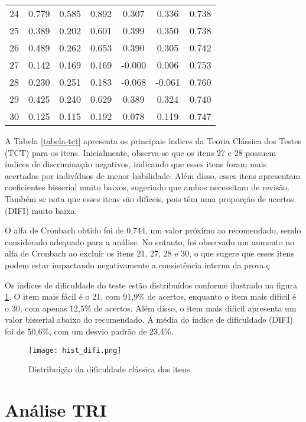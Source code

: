 \begin{table}[H]
{\begin{tabular*}{.6\textwidth}{@{\extracolsep{\fill}}ccccccc@{}}
			24 & 0.779 & 0.585 & 0.892 & 0.307 & 0.336 & 0.738 \\ 
			25 & 0.389 & 0.202 & 0.601 & 0.399 & 0.350 & 0.738 \\ 
			26 & 0.489 & 0.262 & 0.653 & 0.390 & 0.305 & 0.742 \\ 
			27 & 0.142 & 0.169 & 0.169 & -0.000 & 0.006 & 0.753 \\ 
			28 & 0.230 & 0.251 & 0.183 & -0.068 & -0.061 & 0.760 \\ 
			29 & 0.425 & 0.240 & 0.629 & 0.389 & 0.324 & 0.740 \\ 
			30 & 0.125 & 0.115 & 0.192 & 0.078 & 0.119 & 0.747 \\  
			\bottomrule
		\end{tabular*}
	}{%
	}
\end{table}

A Tabela \ref{tabela-tct} apresenta os principais índices da Teoria Clássica dos Testes (TCT) para os itens. Inicialmente, observa-se que os itens 27 e 28 possuem índices de discriminação negativos, indicando que esses itens foram mais acertados por indivíduos de menor habilidade. Além disso, esses itens apresentam coeficientes bisserial muito baixos, sugerindo que ambos necessitam de revisão. Também se nota que esses itens são difíceis, pois têm uma proporção de acertos (DIFI) muito baixa.


O alfa de Cronbach obtido foi de 0,744, um valor próximo ao recomendado, sendo considerado adequado para a análise. No entanto, foi observado um aumento no alfa de Cronbach ao excluir os itens 21, 27, 28 e 30, o que sugere que esses itens podem estar impactando negativamente a consistência interna da prova.ç


Os índices de dificuldade do teste estão distribuídos conforme ilustrado na figura \ref{fig:hist_difi}. O item mais fácil é o 21, com 91,9\% de acertos, enquanto o item mais difícil é o 30, com apenas 12,5\% de acertos. Além disso, o item mais difícil apresenta um valor bisserial abaixo do recomendado. A média do índice de dificuldade (DIFI) foi de 50,6\%, com um desvio padrão de 23,4\%.

\begin{figure}[H]
	\centering
	\texttt{[image: hist\_difi.png]}
	\caption{Distribuição da dificuldade clássica dos itens.}
	\label{fig:hist_difi}
\end{figure}


\section{Análise TRI}


